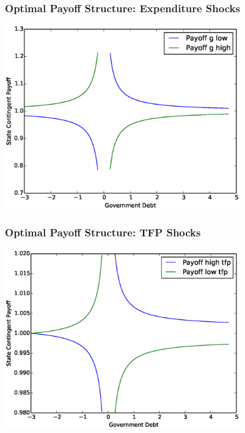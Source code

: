 \documentclass{beamer}
\begin{document}
  \begin{frame}
   \frametitle{Optimal Payoff Structure: Expenditure Shocks }
	\begin{center}
		\includegraphics[width = 4in]{Images/p_graph.eps}
	\end{center}
  \end{frame}

  \begin{frame}
   \frametitle{Optimal Payoff Structure: TFP Shocks }
	\begin{center}
		\includegraphics[width = 4in]{Images/p_graph_tfp.eps}
	\end{center}
  \end{frame}
\end{document}

